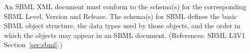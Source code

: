 An SBML XML document must conform to the schema(s) for the corresponding
SBML Level, Version and Release.  The schema(s) for SBML defines the basic
SBML object structure, the data types used by those objects, and the order
in which the objects may appear in an SBML document.  (References: SBML
L3V1 Section~\ref{sec:sbml}.)
